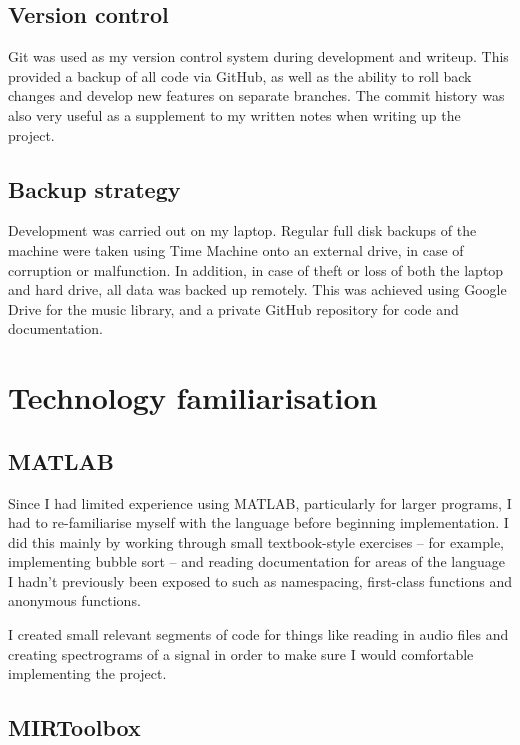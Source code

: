 \documentclass[12pt,a4paper,twoside,openright]{report}
\begin{document}
\subsection{Version control}

Git was used as my version control system during development and writeup. This provided a backup of all code via GitHub, as well as the ability to roll back changes and develop new features on separate branches. The commit history was also very useful as a supplement to my written notes when writing up the project.


\subsection{Backup strategy}

Development was carried out on my laptop. Regular full disk backups of the machine were taken using Time Machine onto an external drive, in case of corruption or malfunction. In addition, in case of theft or loss of both the laptop and hard drive, all data was backed up remotely. This was achieved using Google Drive for the music library, and a private GitHub repository for code and documentation.




\section{Technology familiarisation}

\subsection{MATLAB}

Since I had limited experience using MATLAB, particularly for larger programs, I had to re-familiarise myself with the language before beginning implementation. I did this mainly by working through small textbook-style exercises -- for example, implementing bubble sort -- and reading documentation for areas of the language I hadn't previously been exposed to such as namespacing, first-class functions and anonymous functions.

I created small relevant segments of code for things like reading in audio files and creating spectrograms of a signal in order to make sure I would comfortable implementing the project.

\subsection{MIRToolbox}
\end{document}
